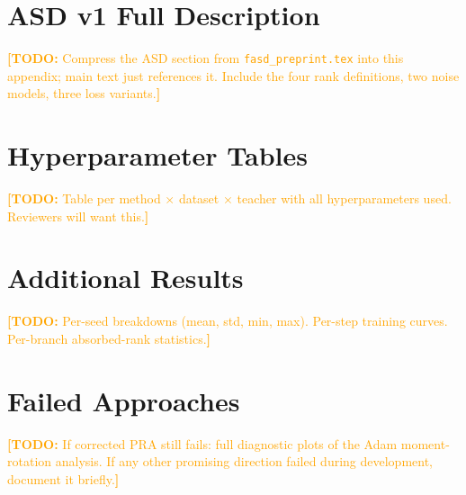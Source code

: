\documentclass{article}
\newcommand{\todo}[1]{\textcolor{orange}{\textbf{[TODO:} #1\textbf{]}}}
\begin{document}
\appendix

\section{ASD v1 Full Description}
\label{app:asd}
\todo{Compress the ASD section from \texttt{fasd\_preprint.tex} into this
appendix; main text just references it. Include the four rank definitions,
two noise models, three loss variants.}

\section{Hyperparameter Tables}
\label{app:hp}
\todo{Table per method × dataset × teacher with all hyperparameters used.
Reviewers will want this.}

\section{Additional Results}
\label{app:extra}
\todo{Per-seed breakdowns (mean, std, min, max). Per-step training curves.
Per-branch absorbed-rank statistics.}

\section{Failed Approaches}
\label{app:failed}
\todo{If corrected PRA still fails: full diagnostic plots of the Adam
moment-rotation analysis. If any other promising direction failed during
development, document it briefly.}
\end{document}
